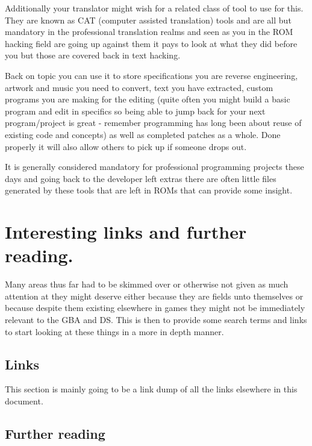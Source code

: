 \documentclass[
]{book}
\begin{document}
Additionally your translator might wish for a related class of tool to use for this. They are known as CAT (computer assisted translation) tools and are all but mandatory in the professional translation realms and seen as you in the ROM hacking field are going up against them it pays to look at what they did before you but those are covered back in text hacking.

Back on topic you can use it to store specifications you are reverse engineering, artwork and music you need to convert, text you have extracted, custom programs you are making for the editing (quite often you might build a basic program and edit in specifics so being able to jump back for your next program/project is great - remember programming has long been about reuse of existing code and concepts) as well as completed patches as a whole. Done properly it will also allow others to pick up if someone drops out.

It is generally considered mandatory for professional programming projects these days and going back to the developer left extras there are often little files generated by these tools that are left in ROMs that can provide some insight.

\hypertarget{interesting-links-and-further-reading.}{%
\chapter{Interesting links and further reading.}\label{interesting-links-and-further-reading.}}

Many areas thus far had to be skimmed over or otherwise not given as much attention at they might deserve either because they are fields unto themselves or because despite them existing elsewhere in games they might not be immediately relevant to the GBA and DS. This is then to provide some search terms and links to start looking at these things in a more in depth manner.

\hypertarget{links}{%
\section{Links}\label{links}}

This section is mainly going to be a link dump of all the links elsewhere in this document.

\hypertarget{further-reading}{%
\section{Further reading}\label{further-reading}}
\end{document}
